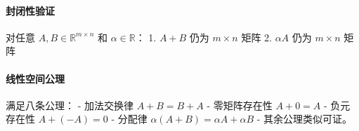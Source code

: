 \paragraph{封闭性验证}  
对任意 \(A, B \in \mathbb{R}^{m \times n}\) 和 \(\alpha \in \mathbb{R}\)：  
1. \(A + B\) 仍为 \(m \times n\) 矩阵  
2. \(\alpha A\) 仍为 \(m \times n\) 矩阵  

\paragraph{线性空间公理}  
满足八条公理：  
- 加法交换律 \(A+B = B+A\)  
- 零矩阵存在性 \(A + 0 = A\)  
- 负元存在性 \(A + (-A) = 0\)  
- 分配律 \(\alpha(A+B) = \alpha A + \alpha B\)  
- 其余公理类似可证。